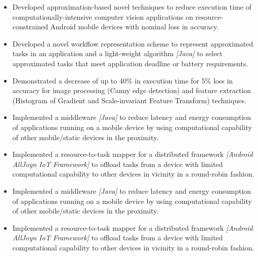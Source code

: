 \documentclass[10pt,a4paper,roman,colorlinks,linkcolor=true]{moderncv}   %
\begin{document}
{
\vspace*{-1\baselineskip}
\begin{itemize}%
\item {Developed approximation-based novel techniques to reduce execution time of computationally-intensive computer vision applications on resource-constrained Android mobile devices with nominal loss in accuracy.} 
\item {Developed a novel workflow representation scheme to represent approximated tasks in an application and 
a light-weight algorithm \emph{[Java]} to select approximated tasks that meet application deadline or battery requirements.} 
\item {Demonstrated a decrease of up to 40\% in execution time for 5\% loss in accuracy for image processing (Canny edge detection) and feature extraction (Histogram of Gradient and Scale-invariant Feature Transform) techniques.}
\end{itemize}
}

{
\vspace*{-1\baselineskip}
\begin{itemize}%
\item {Implemented a middleware \emph{[Java]} to reduce latency and energy consumption of applications running on a mobile device by using computational capability of other mobile/static devices in the proximity.} 
\item {Implemented a resource-to-task mapper for a distributed framework \emph{[Android AllJoyn IoT Framework]} to offload tasks from a device with limited computational capability to other devices in vicinity in a round-robin fashion. }
\end{itemize}
}

{
\vspace*{-1\baselineskip}
\begin{itemize}%
\item {Implemented a middleware \emph{[Java]} to reduce latency and energy consumption of applications running on a mobile device by using computational capability of other mobile/static devices in the proximity.} 
\item {Implemented a resource-to-task mapper for a distributed framework \emph{[Android AllJoyn IoT Framework]} to offload tasks from a device with limited computational capability to other devices in vicinity in a round-robin fashion. }
\end{itemize}
}
\end{document}
